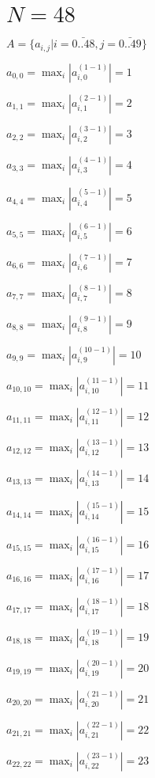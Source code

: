 \documentclass[a4paper,12pt]{article}
\begin{document}
\section{ $N = 48$ }
$A = \{ a _{ i, j } | i = \bar { 0..48 }, j = \bar { 0..49 } \}$

$a _{ 0, 0 } =  \max _i |a _{ i, 0 } ^{ (1 - 1) } | = 1$

$a _{ 1, 1 } =  \max _i |a _{ i, 1 } ^{ (2 - 1) } | = 2$

$a _{ 2, 2 } =  \max _i |a _{ i, 2 } ^{ (3 - 1) } | = 3$

$a _{ 3, 3 } =  \max _i |a _{ i, 3 } ^{ (4 - 1) } | = 4$

$a _{ 4, 4 } =  \max _i |a _{ i, 4 } ^{ (5 - 1) } | = 5$

$a _{ 5, 5 } =  \max _i |a _{ i, 5 } ^{ (6 - 1) } | = 6$

$a _{ 6, 6 } =  \max _i |a _{ i, 6 } ^{ (7 - 1) } | = 7$

$a _{ 7, 7 } =  \max _i |a _{ i, 7 } ^{ (8 - 1) } | = 8$

$a _{ 8, 8 } =  \max _i |a _{ i, 8 } ^{ (9 - 1) } | = 9$

$a _{ 9, 9 } =  \max _i |a _{ i, 9 } ^{ (10 - 1) } | = 10$

$a _{ 10, 10 } =  \max _i |a _{ i, 10 } ^{ (11 - 1) } | = 11$

$a _{ 11, 11 } =  \max _i |a _{ i, 11 } ^{ (12 - 1) } | = 12$

$a _{ 12, 12 } =  \max _i |a _{ i, 12 } ^{ (13 - 1) } | = 13$

$a _{ 13, 13 } =  \max _i |a _{ i, 13 } ^{ (14 - 1) } | = 14$

$a _{ 14, 14 } =  \max _i |a _{ i, 14 } ^{ (15 - 1) } | = 15$

$a _{ 15, 15 } =  \max _i |a _{ i, 15 } ^{ (16 - 1) } | = 16$

$a _{ 16, 16 } =  \max _i |a _{ i, 16 } ^{ (17 - 1) } | = 17$

$a _{ 17, 17 } =  \max _i |a _{ i, 17 } ^{ (18 - 1) } | = 18$

$a _{ 18, 18 } =  \max _i |a _{ i, 18 } ^{ (19 - 1) } | = 19$

$a _{ 19, 19 } =  \max _i |a _{ i, 19 } ^{ (20 - 1) } | = 20$

$a _{ 20, 20 } =  \max _i |a _{ i, 20 } ^{ (21 - 1) } | = 21$

$a _{ 21, 21 } =  \max _i |a _{ i, 21 } ^{ (22 - 1) } | = 22$

$a _{ 22, 22 } =  \max _i |a _{ i, 22 } ^{ (23 - 1) } | = 23$
\end{document}
